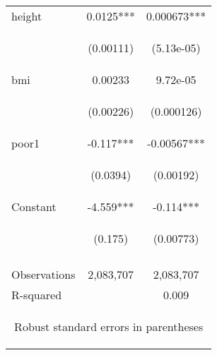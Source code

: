 \documentclass{article}[11pt,subeqn]
\begin{document}
\begin{spacing}{1.25}
\begin{table}[ht]
\begin{center}
\begin{tabular}{lcc}
  height & 0.0125*** & 0.000673*** \\
  \begin{footnotesize}\end{footnotesize} & \begin{footnotesize}(0.00111)\end{footnotesize} & \begin{footnotesize}(5.13e-05)\end{footnotesize} \\
  bmi & 0.00233 & 9.72e-05 \\
  \begin{footnotesize}\end{footnotesize} & \begin{footnotesize}(0.00226)\end{footnotesize} & \begin{footnotesize}(0.000126)\end{footnotesize} \\
  poor1 & -0.117*** & -0.00567*** \\
  \begin{footnotesize}\end{footnotesize} & \begin{footnotesize}(0.0394)\end{footnotesize} & \begin{footnotesize}(0.00192)\end{footnotesize} \\
  Constant & -4.559*** & -0.114*** \\
  \begin{footnotesize}\end{footnotesize} & \begin{footnotesize}(0.175)\end{footnotesize} & \begin{footnotesize}(0.00773)\end{footnotesize} \\
  \begin{footnotesize}\end{footnotesize} & \begin{footnotesize}\end{footnotesize} & \begin{footnotesize}\end{footnotesize} \\
  Observations & 2,083,707 & 2,083,707 \\
  R-squared &  & 0.009  \\ \midrule
\multicolumn{3}{c}{\setstretch{0.9}\begin{footnotesize}Robust standard errors in parentheses\end{footnotesize}} \\

\end{tabular}
\end{center}
\end{table}
\end{spacing}
\end{document}
